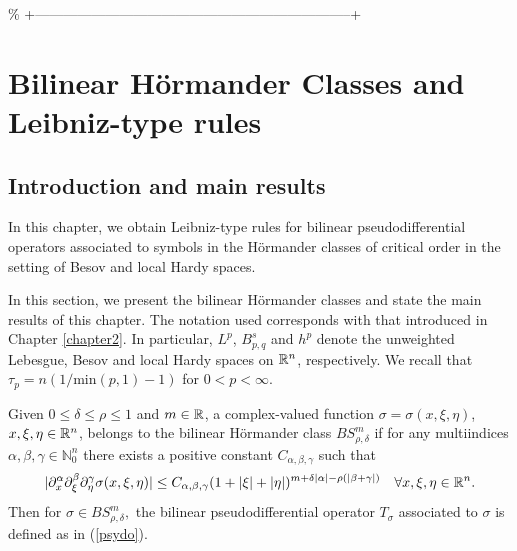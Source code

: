 \% +--------------------------------------------------------------------+

\cleardoublepage


\chapter{Bilinear H\"ormander Classes and Leibniz-type rules}\label{chapter3}
\label{makereference3}

\section{Introduction and main results}

In this chapter, we obtain Leibniz-type rules for bilinear pseudodifferential operators associated to symbols in the H\"ormander classes of critical order in the setting of Besov and local Hardy spaces. 

In this section, we present the bilinear H\"ormander classes and state the main results of this chapter. The notation used corresponds with that introduced in Chapter \ref{chapter2}. In particular, $L^p$, $B^s_{p,q}$ and $h^p$ denote the unweighted Lebesgue, Besov and local Hardy spaces on ${{\mathbb R}^n}$, respectively. We recall that $\tau_p = n(1/\text{min}(p,1) - 1)$ for $0<p<\infty$. 

Given $0\leq \delta \leq \rho \leq 1$ and $m\in\mathbb{R}$, a complex-valued function $\sigma = \sigma(x,\xi,\eta)$, $x,\xi,\eta \in {{\mathbb R}^n}$, belongs to the bilinear H\"ormander class $BS^m_{\rho,\delta}$ if for any multiindices $\alpha,\beta,\gamma \in \mathbb{N}^n_0$ there exists a positive constant $C_{\alpha,\beta,\gamma}$ such that 
\begin{equation}\label{def:Bmrd}
|\partial_x^\alpha \partial_\xi^\beta \partial_\eta^\gamma \sigma(x, \xi, \eta)| \leq C_{\alpha, \beta, \gamma} (1+|\xi|+|\eta|)^{m +\delta \left\vert \alpha \right\vert-\rho(\left\vert \beta+\gamma \right\vert)} \quad \forall x, \xi, \eta \in {{\mathbb R}^n}.
\end{equation}
Then for $\sigma \in BS^m_{\rho,\delta},$ the bilinear pseudodifferential operator $T_\sigma$ associated to $\sigma$ is defined as in (\ref{psydo}). 

